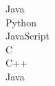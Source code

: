 \documentclass[]{friggeri-cv} %
\begin{document}
\begin{minipage}[t]{0.5\linewidth}
\begin{flushright}
Java\quad{\color{red} $\varheartsuit\varheartsuit\varheartsuit\varheartsuit\varheartsuit\varheartsuit\varheartsuit\varheartsuit\varheartsuit\varheartsuit\varheartsuit\varheartsuit\varheartsuit\varheartsuit$}{\color{black} $\varheartsuit$} \\

Python\quad{\color{red} $\varheartsuit\varheartsuit\varheartsuit\varheartsuit\varheartsuit\varheartsuit\varheartsuit\varheartsuit\varheartsuit\varheartsuit\varheartsuit\varheartsuit$}{\color{black} $\varheartsuit\varheartsuit\varheartsuit$} \\ 

JavaScript\quad{\color{red} $\varheartsuit\varheartsuit\varheartsuit\varheartsuit\varheartsuit\varheartsuit\varheartsuit\varheartsuit\varheartsuit\varheartsuit\varheartsuit\varheartsuit\varheartsuit$}{\color{black} $\varheartsuit\varheartsuit$} \\ 

 C\quad{\color{red} $\varheartsuit\varheartsuit\varheartsuit\varheartsuit\varheartsuit\varheartsuit\varheartsuit\varheartsuit\varheartsuit\varheartsuit\varheartsuit\varheartsuit\varheartsuit$}{\color{black} $\varheartsuit\varheartsuit$} \\
 
 C++\quad{\color{red} $\varheartsuit\varheartsuit\varheartsuit\varheartsuit\varheartsuit\varheartsuit\varheartsuit\varheartsuit\varheartsuit\varheartsuit\varheartsuit\varheartsuit\varheartsuit$}{\color{black} $\varheartsuit\varheartsuit$} \\
 
Java\quad{\color{red} $\varheartsuit\varheartsuit\varheartsuit\varheartsuit\varheartsuit\varheartsuit\varheartsuit\varheartsuit\varheartsuit\varheartsuit\varheartsuit\varheartsuit\varheartsuit\varheartsuit$}{\color{black} $\varheartsuit$} \\
 \end{flushright}

    \end{minipage}%
\end{document}
